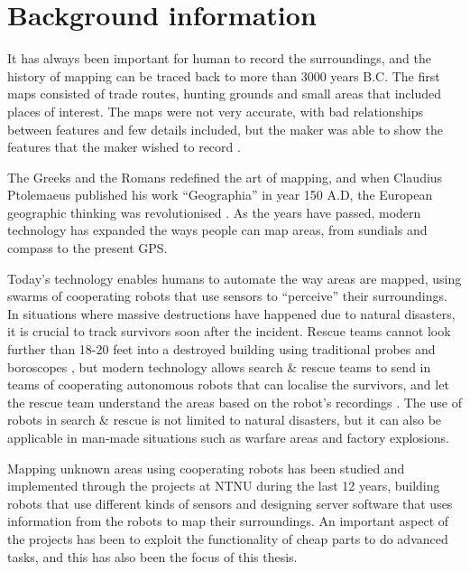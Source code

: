 \section{Background information}
It has always been important for human to record the surroundings, and the history of mapping can be traced back to more than 3000 years B.C. The first maps consisted of trade routes, hunting grounds and small areas that included places of interest. The maps were not very accurate, with bad relationships between features and few details included, but the maker was able to show the features that the maker wished to record \cite{histmap}.

The Greeks and the Romans redefined the art of mapping, and when Claudius Ptolemaeus published his work ``Geographia'' in year 150 A.D, the European geographic thinking was revolutionised \cite{histmap}. As the years have passed, modern technology has expanded the ways people can map areas, from sundials and compass to the present GPS.

Today's technology enables humans to automate the way areas are mapped, using swarms of cooperating robots that use sensors to ``perceive'' their surroundings. In situations where massive destructions have happened due to natural disasters, it is crucial to track survivors soon after the incident. Rescue teams cannot look further than 18-20 feet into a destroyed building using traditional probes and boroscopes \cite{crasar}, but modern technology allows search \& rescue teams to send in teams of cooperating autonomous robots that can localise the survivors, and let the rescue team understand the areas based on the robot's recordings \cite{popsci}. The use of robots in search \& rescue is not limited to natural disasters, but it can also be applicable in man-made situations such as warfare areas and factory explosions.

Mapping unknown areas using cooperating robots has been studied and implemented through the projects at NTNU during the last 12 years, building robots that use different kinds of sensors and designing server software that uses information from the robots to map their surroundings. An important aspect of the projects has been to exploit the functionality of cheap parts to do advanced tasks, and this has also been the focus of this thesis.
